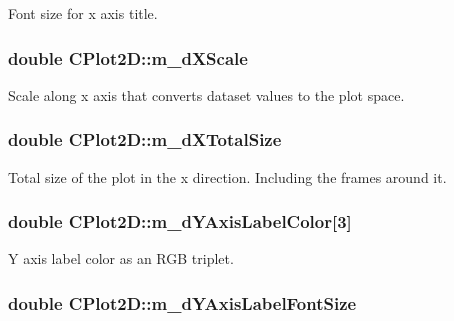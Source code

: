 Font size for x axis title. \hypertarget{class_c_plot2_d_adab27fd03a28f14e399c857da776270c}{
\subsubsection[{m\-\_\-d\-X\-Scale}]{\setlength{\rightskip}{0pt plus 5cm}double C\-Plot2\-D\-::m\-\_\-d\-X\-Scale\hspace{0.3cm}{\ttfamily [protected]}}}\label{class_c_plot2_d_adab27fd03a28f14e399c857da776270c}
Scale along x axis that converts dataset values to the plot space. \hypertarget{class_c_plot2_d_a6aa5e4fe6454dce99c5c04de04c2fdbd}{
\subsubsection[{m\-\_\-d\-X\-Total\-Size}]{\setlength{\rightskip}{0pt plus 5cm}double C\-Plot2\-D\-::m\-\_\-d\-X\-Total\-Size\hspace{0.3cm}{\ttfamily [protected]}}}\label{class_c_plot2_d_a6aa5e4fe6454dce99c5c04de04c2fdbd}
Total size of the plot in the x direction. Including the frames around it. \hypertarget{class_c_plot2_d_a5015c44c4b026dcd0f09a1bd3b3a47b9}{
\subsubsection[{m\-\_\-d\-Y\-Axis\-Label\-Color}]{\setlength{\rightskip}{0pt plus 5cm}double C\-Plot2\-D\-::m\-\_\-d\-Y\-Axis\-Label\-Color\mbox{[}3\mbox{]}\hspace{0.3cm}{\ttfamily [protected]}}}\label{class_c_plot2_d_a5015c44c4b026dcd0f09a1bd3b3a47b9}
Y axis label color as an R\-G\-B triplet. \hypertarget{class_c_plot2_d_a452e31df37bbdbd99a04ba349b15cc0c}{
\subsubsection[{m\-\_\-d\-Y\-Axis\-Label\-Font\-Size}]{\setlength{\rightskip}{0pt plus 5cm}double C\-Plot2\-D\-::m\-\_\-d\-Y\-Axis\-Label\-Font\-Size\hspace{0.3cm}{\ttfamily [protected]}}}\label{class_c_plot2_d_a452e31df37bbdbd99a04ba349b15cc0c}

